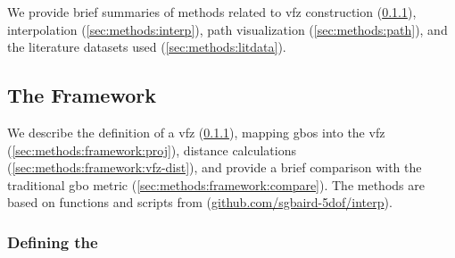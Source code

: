 \documentclass[final,twocolumn,12pt]{elsarticle}
\begin{document}
	We provide brief summaries of methods related to \gls{vfz} construction  (\cref{sec:methods:framework:vfz}), interpolation (\cref{sec:methods:interp}), path visualization (\cref{sec:methods:path}), and the literature datasets used (\cref{sec:methods:litdata}).
	
	\subsection{The  Framework}
	\label{sec:methods:framework}

    We describe the definition of a \gls{vfz} (\cref{sec:methods:framework:vfz}), mapping \glspl{gbo} into the \gls{vfz} (\cref{sec:methods:framework:proj}), distance calculations (\cref{sec:methods:framework:vfz-dist}), and provide a brief comparison with the traditional \gls{gbo} metric (\cref{sec:methods:framework:compare}). The methods are based on functions and scripts from (\url{github.com/sgbaird-5dof/interp}).
%
%
	\subsubsection{Defining the }
	\label{sec:methods:framework:vfz}
	
\end{document}
